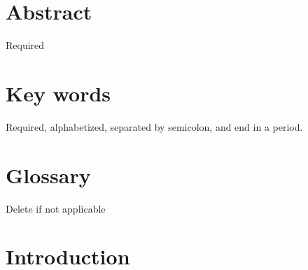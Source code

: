 \documentclass[12pt]{article}
\begin{document}
\section*{Abstract}
\normalsize Required\\
\section*{Key words}
\normalsize Required, alphabetized, separated by semicolon, and end in a period.\\
\pagebreak
\begin{center}
	\tableofcontents
	\listoftables
	\listoffigures
\end{center}
\pagebreak
\section*{Glossary}
Delete if not applicable\\
\pagebreak
\section{Introduction}
\label{sec:intro}
\end{document}
